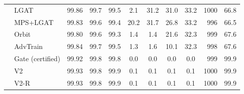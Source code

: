 \begin{tabular}{@{}llcccccccrr@{}}
 & LGAT & 99.86 & 99.7 & 99.5 & 2.1 & 31.2 & 31.0 & 33.2 & 1000 & 66.8 \\
 & MPS+LGAT & 99.83 & 99.6 & 99.4 & 20.2 & 31.7 & 26.8 & 33.2 & 996 & 66.5 \\
 & Orbit & 99.80 & 99.6 & 99.3 & 1.4 & 1.4 & 21.6 & 32.3 & 999 & 67.6 \\
 & AdvTrain & 99.84 & 99.7 & 99.5 & 1.3 & 1.6 & 10.1 & 32.3 & 998 & 67.6 \\
 & Gate (certified) & 99.92 & 99.8 & 99.8 & 0.0 & 0.0 & 0.0 & 0.0 & 999 & 99.9 \\
 & V2 & 99.93 & 99.8 & 99.9 & 0.1 & 0.1 & 0.1 & 0.1 & 1000 & 99.9 \\
 & V2-R & 99.93 & 99.8 & 99.9 & 0.1 & 0.1 & 0.1 & 0.1 & 1000 & 99.9 \\
\bottomrule
\end{tabular}
